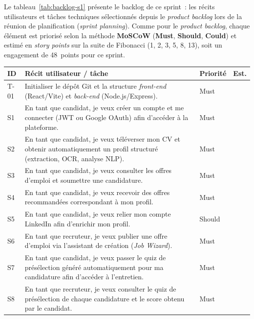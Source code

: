 Le tableau~\ref{tab:backlog-s1} présente le backlog de ce sprint~: les récits utilisateurs et tâches techniques sélectionnés depuis le \textit{product backlog} lors de la réunion de planification (\textit{sprint planning}). Comme pour le \textit{product backlog}, chaque élément est priorisé selon la méthode \textbf{MoSCoW} (\textbf{Must}, \textbf{Should}, \textbf{Could}) et estimé en \textit{story points} sur la suite de Fibonacci (1, 2, 3, 5, 8, 13), soit un engagement de 48~points pour ce sprint.

\begin{table}[H]
  \centering
  \footnotesize
  \renewcommand{\arraystretch}{1.3}
  \setlength{\tabcolsep}{5pt}
  \begin{tabularx}{\textwidth}{|>{\centering\arraybackslash}p{1.1cm}|>{\raggedright\arraybackslash}X|>{\centering\arraybackslash}p{1.7cm}|>{\centering\arraybackslash}p{0.9cm}|}
    \hline
    \rowcolor{blue!10}
    \textbf{ID} & \textbf{Récit utilisateur / tâche} & \textbf{Priorité} & \textbf{Est.} \\
    \hline
    T-01 & Initialiser le dépôt Git et la structure \textit{front-end} (React/Vite) et \textit{back-end} (Node.js/Express). & Must & 5 \\
    \hline
    S1 & En tant que candidat, je veux créer un compte et me connecter (JWT ou Google OAuth) afin d'accéder à la plateforme. & Must & 5 \\
    \hline
    S2 & En tant que candidat, je veux téléverser mon CV et obtenir automatiquement un profil structuré (extraction, OCR, analyse NLP). & Must & 8 \\
    \hline
    S3 & En tant que candidat, je veux consulter les offres d'emploi et soumettre une candidature. & Must & 3 \\
    \hline
    S4 & En tant que candidat, je veux recevoir des offres recommandées correspondant à mon profil. & Must & 5 \\
    \hline
    S5 & En tant que candidat, je veux relier mon compte LinkedIn afin d'enrichir mon profil. & Should & 3 \\
    \hline
    S6 & En tant que recruteur, je veux publier une offre d'emploi via l'assistant de création (\textit{Job Wizard}). & Must & 5 \\
    \hline
    S7 & En tant que candidat, je veux passer le quiz de présélection généré automatiquement pour ma candidature afin d'accéder à l'entretien. & Must & 5 \\
    \hline
    S8 & En tant que recruteur, je veux consulter le quiz de présélection de chaque candidature et le score obtenu par le candidat. & Must & 3 \\

\end{tabularx}
\end{table}
